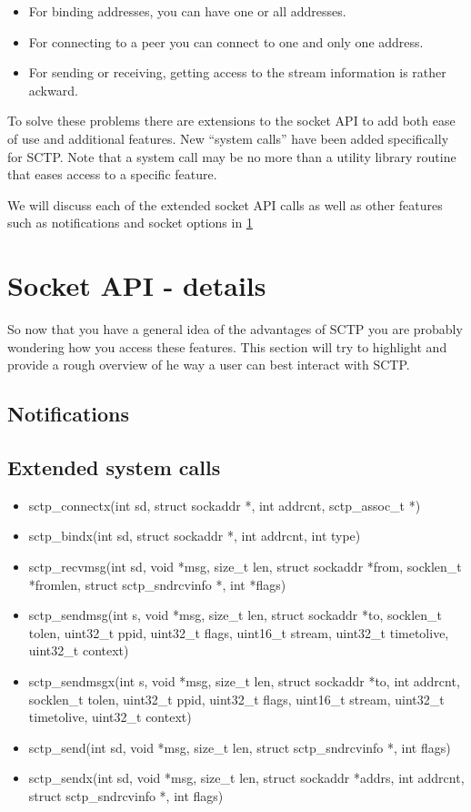 \documentclass[conference]{IEEEtran}
\begin{document}
\begin{itemize}
 \item  For binding addresses, you can have one or all addresses.
 \item  For connecting to a peer you can connect to one and only one address.
 \item  For sending or receiving, getting access to the stream information is rather ackward.
\end{itemize}

To solve these problems there are extensions to the socket API to add
both ease of use and additional features. New ``system calls'' have been added
specifically for SCTP. Note that a system call may be no more than a utility library
routine that eases access to a specific feature. 

We will discuss each of the extended socket API calls as well as other features such
as notifications and socket options in \ref{adv}


\section{Socket API - details}
\label{adv}
So now that you have a general idea of the advantages of SCTP you are probably
wondering how you access these features. This section will try to highlight and provide
a rough overview of he way a user can best interact with SCTP.


\subsection{Notifications}

\subsection{Extended system calls}

\begin{itemize}
 \item  sctp\_connectx(int sd, struct sockaddr *, int addrcnt, sctp\_assoc\_t *)
 \item  sctp\_bindx(int sd, struct sockaddr *, int addrcnt, int type)
 \item  sctp\_recvmsg(int sd, void *msg, size\_t len, struct sockaddr *from, socklen\_t *fromlen, struct sctp\_sndrcvinfo *, int *flags)
 \item  sctp\_sendmsg(int s, void *msg, size\_t len, struct sockaddr *to, socklen\_t tolen, uint32\_t ppid, uint32\_t flags, uint16\_t stream, uint32\_t timetolive, uint32\_t context)
 \item  sctp\_sendmsgx(int s, void *msg, size\_t len, struct sockaddr *to, int addrcnt, socklen\_t tolen, uint32\_t ppid, uint32\_t flags, uint16\_t stream, uint32\_t timetolive, uint32\_t context)
 \item  sctp\_send(int sd, void *msg, size\_t len, struct sctp\_sndrcvinfo *, int flags)
 \item  sctp\_sendx(int sd, void *msg, size\_t len, struct sockaddr *addrs, int addrcnt, struct sctp\_sndrcvinfo *, int flags)
\end{itemize}
\end{document}
